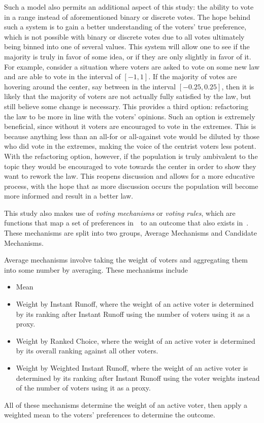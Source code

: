 Such a model also permits an additional aspect of this study: the ability to vote in
a range instead of aforementioned binary or discrete votes.
The hope behind such a system is to gain a better understanding of the voters'
true preference, which is not possible with binary or discrete votes due to all votes
ultimately being binned into one of several values.
This system will allow one to see if the majority is truly in favor of some idea, or
if they are only slightly in favor of it.
For example, consider a situation where voters are asked to vote on some new law and
are able to vote in the interval of $[-1, 1]$.
If the majority of votes are hovering around the center, say between in the interval
$[-0.25, 0.25]$, then it is likely that the majority of voters are not actually fully
satisfied by the law, but still believe some change is necessary.
This provides a third option: refactoring the law to be more in line with the
voters' opinions.
Such an option is extremely beneficial, since without it voters are encouraged to
vote in the extremes.
This is because anything less than an all-for or all-against vote would be diluted by
those who did vote in the extremes, making the voice of the centrist voters less potent.
With the refactoring option, however, if the population is truly ambivalent to the
topic they would be encouraged to vote towards the center in order to show they want
to rework the law.
This reopens discussion and allows for a more educative process, with the hope that
as more discussion occurs the population will become more informed and result in a
better law.

This study also makes use of \textit{voting mechanisms} or \textit{voting rules},
which are functions that map a set of preferences in~\systemspace\ to an outcome that
also exists in~\systemspace.
These mechanisms are split into two groups, Average Mechanisms and Candidate Mechanisms.

Average mechanisms involve taking the weight of voters and aggregating them into some
number by averaging.
These mechanisms include
\begin{itemize}
    \item Mean
    \item Weight by Instant Runoff, where the weight of an active voter is determined by
    its ranking after Instant Runoff using the number of voters using it as a proxy.
    \item Weight by Ranked Choice, where the weight of an active voter is determined by
    its overall ranking against all other voters.
    \item Weight by Weighted Instant Runoff, where the weight of an active voter is
    determined by its ranking after Instant Runoff using the voter weights instead of
    the number of voters using it as a proxy.
\end{itemize}
All of these mechanisms determine the weight of an active voter, then  apply a
weighted mean to the voters' preferences to determine the outcome.

